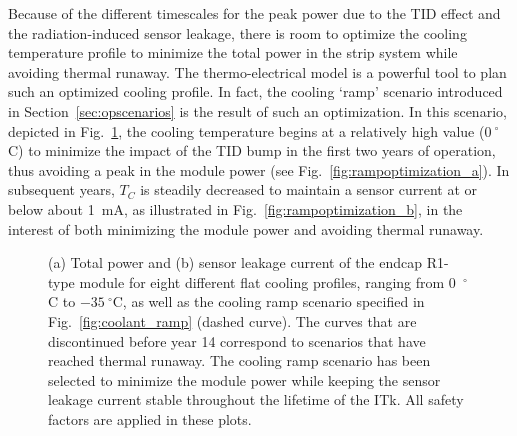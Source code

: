 Because of the different timescales for the peak power due to the TID effect and the radiation-induced sensor leakage, there is room to optimize the cooling temperature profile to minimize the total power in the strip system while avoiding thermal runaway. The thermo-electrical model is a powerful tool to plan such an optimized cooling profile. In fact, the cooling `ramp' scenario introduced in Section~\ref{sec:opscenarios} is the result of such an optimization.
In this scenario, depicted in Fig.~\ref{fig:rampoptimization}, the cooling temperature begins at a relatively high value ($0~^\circ$C) to minimize the impact of the TID bump in the first two years of operation, thus avoiding a peak in the module power (see Fig.~\ref{fig:rampoptimization_a}). In subsequent years, $T_C$ is steadily decreased to maintain a sensor current at or below about 1~mA, as illustrated in Fig.~\ref{fig:rampoptimization_b}, in the interest of both minimizing the module power and avoiding thermal runaway.

\begin{figure}[t!]
\centering
{}\quad\quad
{}
\caption{(a) Total power and (b) sensor leakage current of the endcap R1-type module for eight different flat cooling profiles, ranging from 0~$^\circ$C to $-35~^\circ$C, as well as the cooling ramp scenario specified in Fig.~\ref{fig:coolant_ramp} (dashed curve). The curves that are discontinued before year 14 correspond to scenarios that have reached thermal runaway. The cooling ramp scenario has been selected to minimize the module power while keeping the sensor leakage current stable throughout the lifetime of the ITk. All safety factors are applied in these plots.}
\label{fig:rampoptimization}
\end{figure}
